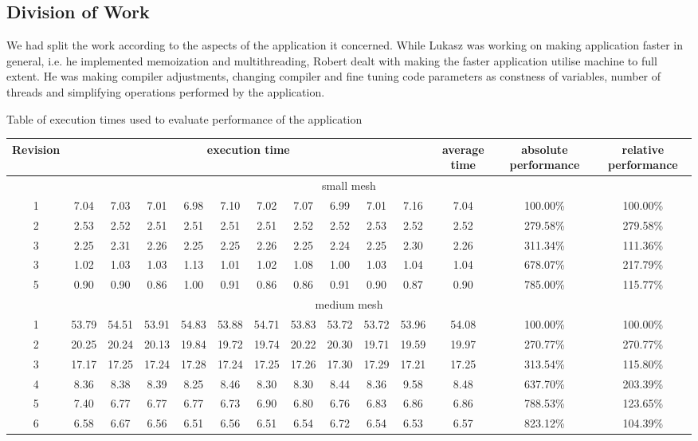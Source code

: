 \documentclass[conference]{IEEEtran}
\begin{document}
\subsection{Division of Work}
We had split the work according to the aspects of the application it concerned. While Lukasz was working on making application faster in general, i.e. he implemented memoization and multithreading, Robert dealt with making the faster application utilise machine to full extent. He was making compiler adjustments, changing compiler and fine tuning code parameters as constness of variables, number of threads and simplifying operations performed by the application.

\begin{sidewaystable}
\centering
Table of execution times used to evaluate performance of the application\\[10pt]
\begin{tabular}{ |c|c|c|c|c|c|c|c|c|c|c|c|c|c| }
  \hline
  Revision & \multicolumn{10}{|c|}{execution time} & average time & absolute performance & relative performance \\
  \hline \hline
  \multicolumn{14}{|c|}{small mesh} \\ \hline
1 & 7.04 &  7.03 &  7.01 &  6.98 &  7.10 &  7.02 &  7.07 &  6.99 &  7.01 &  7.16 &  7.04 &  100.00\% & 100.00\% \\ \hline
2 & 2.53 &  2.52 &  2.51 &  2.51 &  2.51 &  2.51 &  2.52 &  2.52 &  2.53 &  2.52 &  2.52 &  279.58\% & 279.58\% \\ \hline
3 & 2.25 &  2.31 &  2.26 &  2.25 &  2.25 &  2.26 &  2.25 &  2.24 &  2.25 &  2.30 &  2.26 &  311.34\% & 111.36\% \\ \hline
3 & 1.02 &  1.03 &  1.03 &  1.13 &  1.01 &  1.02 &  1.08 &  1.00 &  1.03 &  1.04 &  1.04 &  678.07\% & 217.79\% \\ \hline
5 & 0.90 &  0.90 &  0.86 &  1.00 &  0.91 &  0.86 &  0.86 &  0.91 &  0.90 &  0.87 &  0.90 &  785.00\% & 115.77\% \\ \hline
\hline
\multicolumn{14}{|c|}{medium mesh} \\ \hline
1 & 53.79 & 54.51 & 53.91 & 54.83 & 53.88 & 54.71 & 53.83 & 53.72 & 53.72 & 53.96 & 54.08 & 100.00\% & 100.00\% \\ \hline
2 & 20.25 & 20.24 & 20.13 & 19.84 & 19.72 & 19.74 & 20.22 & 20.30 & 19.71 & 19.59 & 19.97 & 270.77\% & 270.77\% \\ \hline
3 & 17.17 & 17.25 & 17.24 & 17.28 & 17.24 & 17.25 & 17.26 & 17.30 & 17.29 & 17.21 & 17.25 & 313.54\% & 115.80\% \\ \hline
4 & 8.36 &  8.38 &  8.39 &  8.25 &  8.46 &  8.30 &  8.30 &  8.44 &  8.36 &  9.58 &  8.48 & 637.70\% & 203.39\% \\ \hline
5 & 7.40 &  6.77 &  6.77 &  6.77 &  6.73 &  6.90 &  6.80 &  6.76 &  6.83 &  6.86 &  6.86 & 788.53\% & 123.65\% \\ \hline
6 & 6.58 &  6.67 & 6.56 & 6.51 & 6.56 & 6.51 & 6.54 & 6.72 & 6.54 & 6.53 & 6.57 & 823.12\% & 104.39\% \\ \hline
\end{tabular}
\end{sidewaystable}
\end{document}
